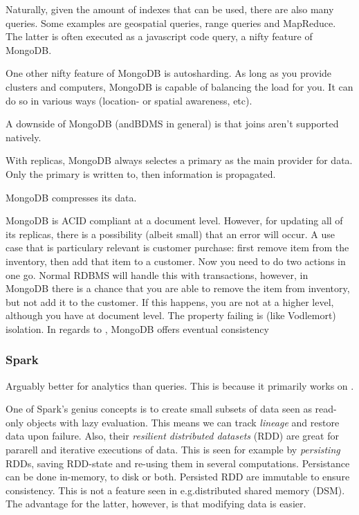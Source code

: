 Naturally, given the amount of indexes that can be used, there are also many queries.
Some examples are geospatial queries, range queries and MapReduce. The latter is often
executed as a javascript code query, a nifty feature of MongoDB.

One other nifty feature of MongoDB is autosharding. As long as you provide clusters
and computers, MongoDB is capable of balancing the load for you. It can do so in various ways
(location- or spatial awareness, etc).

A downside of MongoDB (andBDMS in general) is that joins
aren't supported natively. 

With replicas, MongoDB always selectes a primary as the main provider for data.
Only the primary is written to, then information is propagated.

MongoDB compresses its data.

MongoDB is ACID compliant at a document level. However, for updating all of its replicas, 
there is a possibility (albeit small) that an error will occur. A use case that is particulary relevant
is customer purchase: first remove item from the inventory, then add that item to a customer.
Now you need to do two actions in one go. Normal RDBMS will handle this with transactions,
however, in MongoDB there is a chance that you are able to remove the item from inventory, but not add
it to the customer. If this happens, you are not  at a higher level, although you have  at document level. The property failing is (like Vodlemort) isolation.
In regards to , MongoDB offers eventual consistency

\subsubsection{Spark}\label{sec:spark}
Arguably better for analytics than queries. This is because it primarily works on 
.

One of Spark's genius concepts is to create small subsets of data seen as read-only objects with lazy evaluation.
This means we can track \textit{lineage} and restore data upon failure. Also, their \textit{resilient distributed datasets} (RDD) are great for pararell and iterative executions of data.
This is seen for example by \textit{persisting} RDDs, saving RDD-state and re-using them in several computations.
Persistance can be done in-memory, to disk or both. Persisted RDD are immutable to ensure consistency.
This is not a feature seen in e.g.\@ distributed shared memory (DSM). The advantage for the latter, however,
is that modifying data is easier.



